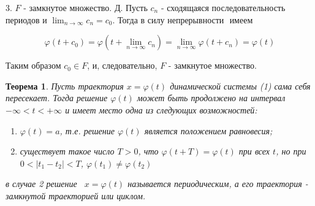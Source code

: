 \documentclass{article}
\theoremstyle{plain} \newtheorem*{theorem*}{Теорема}
\theoremstyle{plain} \newtheorem{theorem}{Теорема}[section]
\theoremstyle{definition} \newtheorem*{corollary*}{Следствие}
\theoremstyle{definition} \newtheorem{corollary}{Следствие}[section]
\begin{document}
3. $F$ - замкнутое множество.
Д. Пусть $c_n$ - сходящаяся последовательность периодов
и $\lim_{n \rightarrow \infty} c_n = c_0$. Тогда в силу
непрерывности $ $ имеем

\begin{equation*}
    \varphi(t + c_0) =
    \varphi(t + \lim_{n \rightarrow \infty} c_n) =
    \lim_{n \rightarrow \infty} \varphi(t + c_n) =
    \varphi(t)
\end{equation*}

Таким образом $c_0 \in F$, и, следовательно,
$F$ - замкнутое множество.


\begin{theorem*}
    Пусть траектория $x = \varphi (t)$ динамической системы
    (1) сама себя пересекает.
    Тогда решение $\varphi (t)$ может быть продолжено на интервал
    $- \infty < t < +\infty$ и имеет место одна
    из следующих возможностей:
    \begin{enumerate}
        \item $\varphi (t) = a$, т.е. решение $\varphi (t)$
            является положением равновесия;
        \item существует такое число $T > 0$, что
            $\varphi (t + T) = \varphi (t)$
            при всех $t$, но при $0 < \vert t_1 - t_2 \vert < T$,
            $\varphi (t_1) \neq \varphi(t_2)$
    \end{enumerate}
    в случае 2 решение \ $x = \varphi(t)$ называется
    периодическим, а его траектория
    - замкнутой траекторией или циклом.
\end{theorem*}
\end{document}
